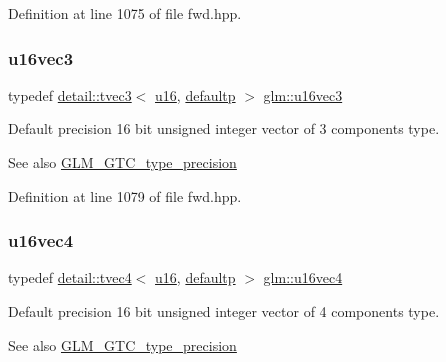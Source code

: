 Definition at line 1075 of file fwd.\+hpp.

\mbox{\label{group__gtc__type__precision_ga372e1184da616b77fcbd48b8c166c24a}} 
\subsubsection{\texorpdfstring{u16vec3}{u16vec3}}
{\footnotesize\ttfamily typedef \hyperlink{structglm_1_1detail_1_1tvec3}{detail\+::tvec3}$<$ \hyperlink{group__gtc__type__precision_gae7a1571503f83d2264ddfa705a6b082a}{u16}, \hyperlink{namespaceglm_a0f04f086094c747d227af4425893f545a9d21ccd8b5a009ec7eb7677befc3bf51}{defaultp} $>$ \hyperlink{group__gtc__type__precision_ga372e1184da616b77fcbd48b8c166c24a}{glm\+::u16vec3}}

Default precision 16 bit unsigned integer vector of 3 components type. \begin{DoxySeeAlso}{See also}
\hyperlink{group__gtc__type__precision}{G\+L\+M\+\_\+\+G\+T\+C\+\_\+type\+\_\+precision} 
\end{DoxySeeAlso}


Definition at line 1079 of file fwd.\+hpp.

\mbox{\label{group__gtc__type__precision_gaac02cce8820bcdbbeea9659aeaa718fb}} 
\subsubsection{\texorpdfstring{u16vec4}{u16vec4}}
{\footnotesize\ttfamily typedef \hyperlink{structglm_1_1detail_1_1tvec4}{detail\+::tvec4}$<$ \hyperlink{group__gtc__type__precision_gae7a1571503f83d2264ddfa705a6b082a}{u16}, \hyperlink{namespaceglm_a0f04f086094c747d227af4425893f545a9d21ccd8b5a009ec7eb7677befc3bf51}{defaultp} $>$ \hyperlink{group__gtc__type__precision_gaac02cce8820bcdbbeea9659aeaa718fb}{glm\+::u16vec4}}

Default precision 16 bit unsigned integer vector of 4 components type. \begin{DoxySeeAlso}{See also}
\hyperlink{group__gtc__type__precision}{G\+L\+M\+\_\+\+G\+T\+C\+\_\+type\+\_\+precision} 
\end{DoxySeeAlso}



